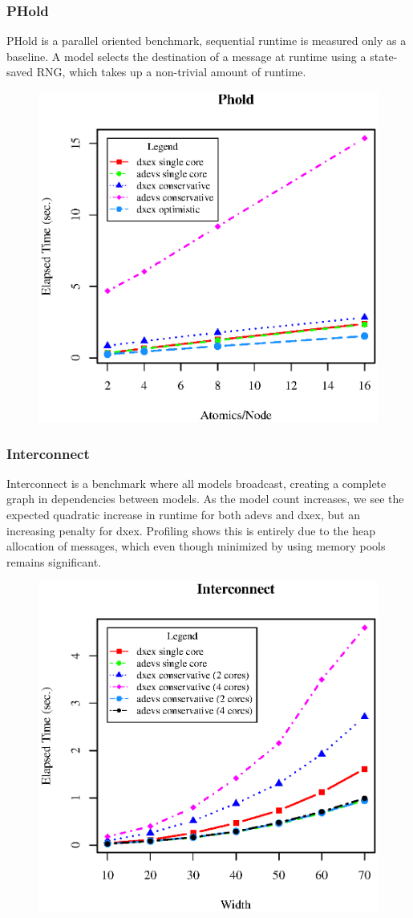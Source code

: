 \subsubsection{PHold}
PHold \cite{PHOLD} is a parallel oriented benchmark, sequential runtime is measured only as a baseline. A model selects the destination of a message at runtime using a state-saved RNG, which takes up a non-trivial amount of runtime.\\
\begin{figure}[h]
	\includegraphics[width=.5\textwidth]{fig/fig4.eps}
	\label{fig4.eps}
\end{figure}

\subsubsection{Interconnect}
Interconnect \cite{van2013research} is a benchmark where all models broadcast, creating a complete graph in dependencies between models. As the model count increases, we see the expected quadratic increase in runtime for both adevs and dxex, but an increasing penalty for dxex. Profiling shows this is entirely due to the heap allocation of messages, which even though minimized by using memory pools remains significant.\\
\begin{figure}[h]
	\includegraphics[width=.5\textwidth]{fig/fig3.eps}
	\label{fig3.eps}
\end{figure}

